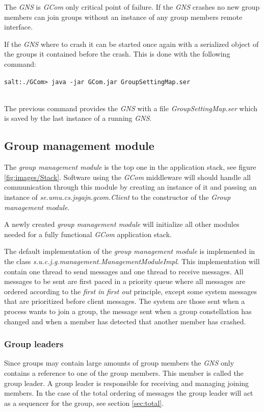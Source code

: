 \documentclass[titlepage, twocolumn, a4paper, 10pt]{article}
\begin{document}
The \textit{GNS} is \textit{GCom} only critical point of failure. If
the \textit{GNS} crashes no new group members can join groups without
an instance of any group members remote interface.

If the \textit{GNS} where to crash it can be started once again with
a serialized object of the groups it contained before the crash. This
is done with the following command:\\
\begin{footnotesize}
  \verb!salt:./GCom> java -jar GCom.jar GroupSettingMap.ser!
\end{footnotesize}\\
The previous command provides the \textit{GNS} with a file
\textit{GroupSettingMap.ser} which is saved by the last instance of a
running \textit{GNS}.

\subsection{Group management module}\label{sec:group-management-module}
The \textit{group management module} is the top one in the application
stack, see figure \ref{fig:images/Stack}. Software using the
\textit{GCom} middleware will should handle all communication through
this module by creating an instance of it and passing an instance of
\textit{se.umu.cs.jsgajn.gcom.Client} to the constructor of the
\textit{Group management module}.

A newly created \textit{group management module} will initialize all
other modules needed for a fully functional \textit{GCom} application
stack.

The default implementation of the \textit{group management module} is
implemented in the class
\textit{s.u.c.j.g.management.ManagementModuleImpl}. This
implementation will contain one thread to send messages and one thread
to receive messages. All messages to be sent are first paced in a
priority queue where all messages are ordered according to the
\textit{first in first out} principle, except some system messages
that are prioritized before client messages. The system are those sent
when a process wants to join a group, the message sent when a group
constellation has changed and when a member has detected that another
member has crashed.

\subsubsection{Group leaders}\label{sec:group-leaders}
Since groups may contain large amounts of group members the
\textit{GNS} only contains a reference to one of the group members.
This member is called the group leader. A group leader is responsible
for receiving and managing joining members. In the case of the total
ordering of messages the group leader will act as a sequencer for the
group, see section \ref{sec:total}.
\end{document}
